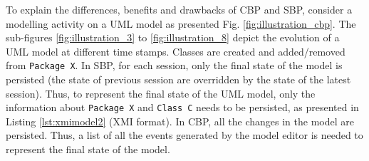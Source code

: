 \documentclass{llncs}
\begin{document}
\vspace{-10pt}
To explain the differences, benefits and drawbacks of CBP and SBP, consider a modelling activity on a UML model as presented Fig. \ref{fig:illustration_cbp}. The sub-figures \ref{fig:illustration_3} to \ref{fig:illustration_8} depict the evolution of a UML model at different time stamps. Classes are created and added/removed from \texttt{Package X}. In SBP, for each session, only the final state of the model is persisted (the state of previous session are overridden by the state of the latest session). Thus, to represent the final state of the UML model, only the information about \texttt{Package X} and \texttt{Class C} needs to be persisted, as presented in Listing \ref{lst:xmimodel2} (XMI format). In CBP, all the changes in the model are persisted. Thus, a list of all the events generated by the model editor is needed to represent the final state of the model.
\end{document}
